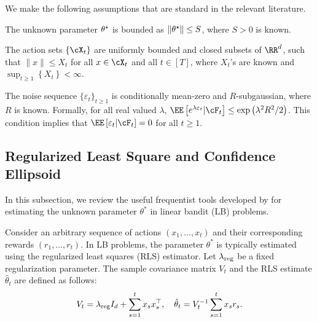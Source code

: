 We make the following assumptions that are standard in the relevant literature.

\begin{assumption}\label{assump:bounded-parameter}
	The unknown parameter  $\theta^\star$ is bounded as  $\|\theta^\star\|\leq S$, where $S > 0$ is known.
\end{assumption}
\begin{assumption}\label{assump:bounded-action-sets}
	The action sets $\{\cX_t\}$ are uniformly bounded and closed subsets of $\RR^d$, such that $\|x\|\leq X_t$ for all $x\in \cX_t$ and all $t\in[T]$, where $X_t$'s are known and $\sup_{t\geq 1}\left\{X_t\right\} < \infty $. %
\end{assumption}


\begin{assumption} \label{assump:noise}
	The noise sequence $\{\varepsilon_t\}_{t\ge 1}$ is conditionally mean-zero and $R$-subgaussian, where $R$ is known. Formally, 
	for all real valued $\lambda$, 
	$
	 \EE\left[e^{\lambda \varepsilon_t} | \cF_t\right] \leq \exp \left(\lambda^2 R^2 / 2\right)
	 $.
	 This condition implies that $\EE \left[\varepsilon_t  | \cF_t\right]=0$ for all $t\geq 1$.
\end{assumption}



\subsection{Regularized  Least Square and Confidence Ellipsoid}

In this subsection, we review the useful frequentist tools developed by \cite{abbasi2011improved} for estimating the unknown parameter $\theta^*$ in linear bandit (LB) problems.

Consider an arbitrary sequence of actions $(x_1,\dots,x_t)$ and their corresponding rewards $(r_1,\dots,r_t)$. In LB problems, the parameter $\theta^*$ is typically estimated using the regularized least squares (RLS) estimator. Let $\lambda_{\text{reg}}$ be a fixed regularization parameter. The sample covariance matrix $V_t$ and the RLS estimate $\hat{\theta}_t$ are defined as follows:
\begin{equation}\label{eq:ridge}
	V_t=\lambda_{\text{reg}} I_d +\sum_{s=1}^{t} x_s x_s^{\top}, \quad \hat{\theta}_t=V_t^{-1} \sum_{s=1}^{t} x_s r_{s}.
\end{equation}

